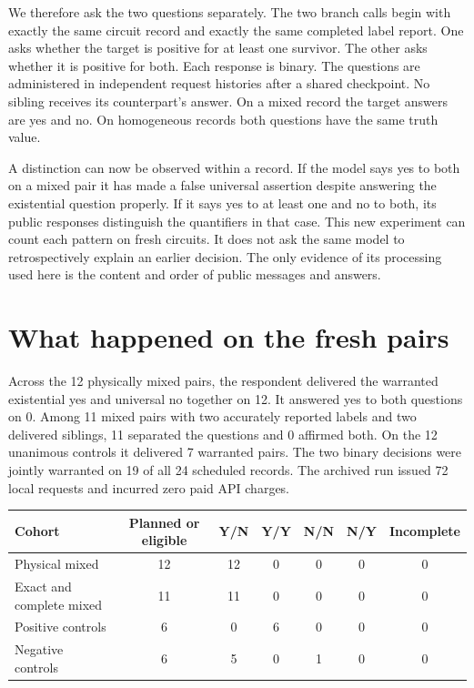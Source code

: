 \documentclass[12pt,letterpaper]{article}
\begin{document}
We therefore ask the two questions separately. The two branch calls begin with exactly the same circuit record and exactly the same completed label report. One asks whether the target is positive for at least one survivor. The other asks whether it is positive for both. Each response is binary. The questions are administered in independent request histories after a shared checkpoint. No sibling receives its counterpart's answer. On a mixed record the target answers are yes and no. On homogeneous records both questions have the same truth value.

A distinction can now be observed within a record. If the model says yes to both on a mixed pair it has made a false universal assertion despite answering the existential question properly. If it says yes to at least one and no to both, its public responses distinguish the quantifiers in that case. This new experiment can count each pattern on fresh circuits. It does not ask the same model to retrospectively explain an earlier decision. The only evidence of its processing used here is the content and order of public messages and answers.



\section{What happened on the fresh pairs}

Across the 12 physically mixed pairs, the respondent delivered the warranted existential yes and universal no together on 12. It answered yes to both questions on 0. Among 11 mixed pairs with two accurately reported labels and two delivered siblings, 11 separated the questions and 0 affirmed both. On the 12 unanimous controls it delivered 7 warranted pairs. The two binary decisions were jointly warranted on 19 of all 24 scheduled records. The archived run issued 72 local requests and incurred zero paid API charges.

\begin{center}{\small\setlength{\tabcolsep}{4pt}\begin{tabularx}{\linewidth}{@{}Ycccccc@{}}\toprule
Cohort & Planned or eligible & Y/N & Y/Y & N/N & N/Y & Incomplete\\\midrule
Physical mixed & 12 & 12 & 0 & 0 & 0 & 0\\
Exact and complete mixed & 11 & 11 & 0 & 0 & 0 & 0\\
Positive controls & 6 & 0 & 6 & 0 & 0 & 0\\
Negative controls & 6 & 5 & 0 & 1 & 0 & 0\\
\bottomrule\end{tabularx}}\end{center}
\end{document}
